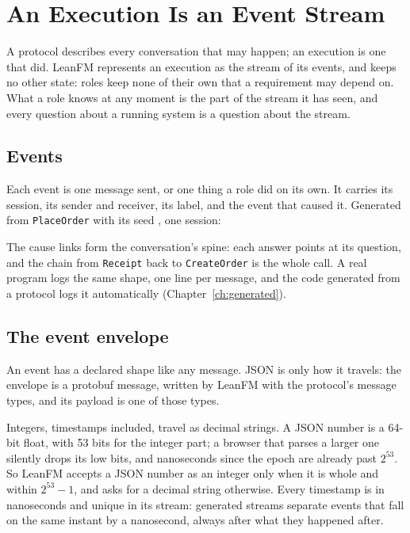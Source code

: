 \chapter{An Execution Is an Event Stream}
\label{ch:execution}
\label{ch:events}

A protocol describes every conversation that may happen; an execution is one that
did. LeanFM represents an execution as the stream of its events, and keeps no
other state: roles keep none of their own that a requirement may depend on. What
a role knows at any moment is the part of the stream it has seen, and every
question about a running system is a question about the stream.

\section{Events}

Each event is one message sent, or one thing a role did on its own. It carries
its session, its sender and receiver, its label, and the event that caused it.
Generated from \texttt{PlaceOrder} with its seed
, one session:



The cause links form the conversation's spine: each answer points at its
question, and the chain from \texttt{Receipt} back to \texttt{CreateOrder} is the
whole call. A real program logs the same shape, one line per message, and the
code generated from a protocol logs it automatically (Chapter~\ref{ch:generated}).

\section{The event envelope}

An event has a declared shape like any message. JSON is only how it travels: the
envelope is a protobuf message, written by LeanFM with the protocol's message
types, and its payload is one of those types.



Integers, timestamps included, travel as decimal strings. A JSON number is a
64-bit float, with 53 bits for the integer part; a browser that parses a larger
one silently drops its low bits, and nanoseconds since the epoch are already past
$2^{53}$. So LeanFM accepts a JSON number as an integer only when it is whole and
within $2^{53}-1$, and asks for a decimal string otherwise. Every timestamp is in
nanoseconds and unique in its stream: generated streams separate events that fall
on the same instant by a nanosecond, always after what they happened after.

